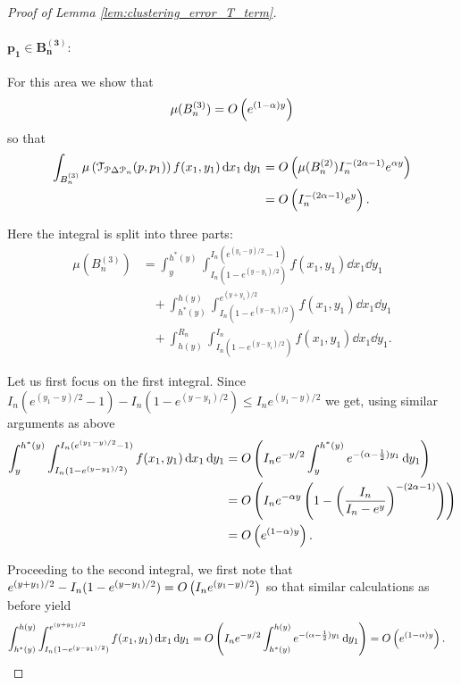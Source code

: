 \begin{proof}[Proof of Lemma \ref{lem:clustering_error_T_term}]
\paragraph{$\bm{p_1 \in B_n^{(3)}}:$}

For this area we show that 
\begin{equation}\label{eq:mu_triangle_diff_3}
	\mu(B_n^{(3)}) = O\left(e^{(1-\alpha)y}\right)
\end{equation} 
so that
\begin{align*}
	\int_{B_n^{(3)}} \mu\left(\mathcal{T}_{{\mathcal P} \Delta {\mathcal P}_n}(p,p_1)\right) 
		f(x_1,y_1)	\operatorname{\mathrm{d}\hspace{-2pt}} x_1 \operatorname{\mathrm{d}\hspace{-2pt}} y_1
	&= O\left(\mu(B_n^{(2)}) I_n^{-(2\alpha - 1)} e^{\alpha y}\right)\\
	&= O\left(I_n^{-(2\alpha-1)} e^{y}\right).
\end{align*}

Here the integral is split into three parts:
\begin{align*}
	\mu(B_n^{(3)}) &= \int_y^{h^\ast(y)} \int_{I_n(1-e^{(y-y_1)/2})}^{I_n(e^{(y_1-y)/2}-1)}
		f(x_1,y_1) \dd x_1 \dd y_1\\
	&\hspace{10pt}+ \int_{h^\ast(y)}^{h(y)} \int_{I_n(1-e^{(y-y_1)/2})}^{e^{(y+y_1)/2}}
		f(x_1,y_1) \dd x_1 \dd y_1\\
	&\hspace{10pt}+ \int_{h(y)}^{R_n} \int_{I_n(1-e^{(y-y_1)/2})}^{I_n}
		f(x_1,y_1) \dd x_1 \dd y_1.
\end{align*}

Let us first focus on the first integral. Since	$I_n(e^{(y_1-y)/2}-1) - I_n(1-e^{(y-y_1)/2}) \le I_n e^{(y_1-y)/2}$ we get,
using similar arguments as above
\begin{align*}
	\int_y^{h^\ast(y)} \int_{I_n(1-e^{(y-y_1)/2})}^{I_n(e^{(y_1-y)/2}-1)} f(x_1,y_1) \operatorname{\mathrm{d}\hspace{-2pt}} x_1 \operatorname{\mathrm{d}\hspace{-2pt}} y_1
	&= O\left(I_n e^{-y/2} \int_y^{h^\ast(y)} e^{-(\alpha - \frac{1}{2})y_1} \operatorname{\mathrm{d}\hspace{-2pt}} y_1\right)\\
	&= O\left(I_n e^{-\alpha y} \left(1 - \left(\frac{I_n}{I_n - e^y}\right)^{-(2\alpha - 1)}\right)\right)\\
	&= O\left(e^{(1-\alpha)y}\right).
\end{align*}

Proceeding to the second integral, we first note that $e^{(y+y_1)/2} - I_n(1-e^{(y-y_1)/2}) = O\left(I_n e^{(y_1-y)/2}\right)$ so that similar calculations as before yield
\begin{align*}
	\int_{h^\ast(y)}^{h(y)} \int_{I_n(1-e^{(y-y_1)/2})}^{e^{(y+y_1)/2}}	f(x_1,y_1) \operatorname{\mathrm{d}\hspace{-2pt}} x_1 \operatorname{\mathrm{d}\hspace{-2pt}} y_1
	&= O\left(I_n e^{-y/2} \int_{h^\ast(y)}^{h(y)} e^{-(\alpha - \frac{1}{2})y_1} \operatorname{\mathrm{d}\hspace{-2pt}} y_1\right)
		= O\left(e^{(1-\alpha)y}\right).
\end{align*}



\end{proof}